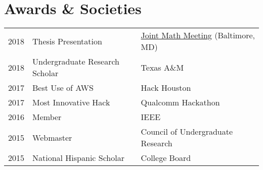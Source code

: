 \documentclass[letterpaper]{deedy-resume} %
\begin{document}
\begin{minipage}[t]{0.66\textwidth}


\section{Awards \& Societies} 

\begin{tabular}{rll}
2018	 & Thesis Presentation & \href{http://jointmathematicsmeetings.org}{Joint Math Meeting} (Baltimore, MD) \\
2018	 & Undergraduate Research Scholar & Texas A\&M \\
2017	 & Best Use of AWS & Hack Houston \\
2017	 & Most Innovative Hack & Qualcomm Hackathon\\
2016	 & Member & IEEE\\
2015	 & Webmaster & Council of Undergraduate Research \\
2015	 & National Hispanic Scholar & College Board \\
\end{tabular}

\sectionspace %



\sectionspace %


\end{minipage} %
\end{document}
